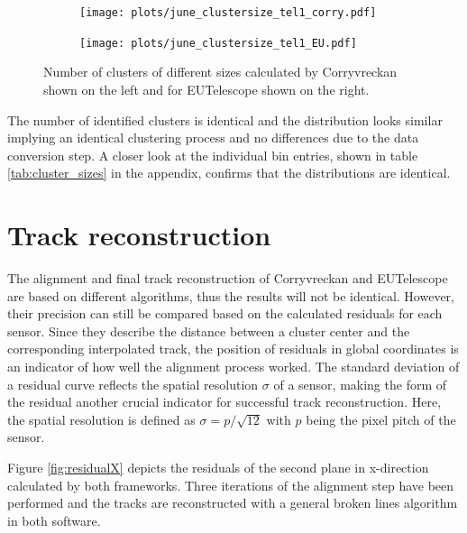 \begin{figure}
  \hspace{-2.5cm}
  \begin{subfigure}{0.62\textwidth}
      \texttt{[image: plots/june\_clustersize\_tel1\_corry.pdf]}
  \end{subfigure}
  \begin{subfigure}{0.62\textwidth}
      \texttt{[image: plots/june\_clustersize\_tel1\_EU.pdf]}
  \end{subfigure}
  \caption{Number of clusters of different sizes calculated by Corryvreckan shown on the left and for EUTelescope shown on the right.}
  \label{fig:cluster_size}
\end{figure}

The number of identified clusters is identical and the distribution looks similar implying an identical clustering process
and no differences due to the data conversion step. A closer look at the individual bin entries, shown in table \ref{tab:cluster_sizes} in the appendix,
confirms that the distributions are identical.

\section{Track reconstruction}
The alignment and final track reconstruction of Corryvreckan and EUTelescope are based on different algorithms, thus the
results will not be identical. However, their precision can still be compared based on the calculated residuals for each sensor.
Since they describe the distance between a cluster center and the corresponding interpolated track, the position of
residuals in global coordinates is an indicator of how well the alignment process worked. The standard deviation of a
residual curve reflects the spatial resolution $\sigma$ of a sensor, making the form of the residual another crucial indicator
for successful track reconstruction. Here, the spatial resolution is defined as ${\sigma = p/\sqrt{12}}$ with $p$ being the
pixel pitch of the sensor.

Figure \ref{fig:residualX} depicts the residuals of the second plane in x-direction calculated by both frameworks. Three iterations
of the alignment step have been performed and the tracks are reconstructed with a general broken lines algorithm in both software.

